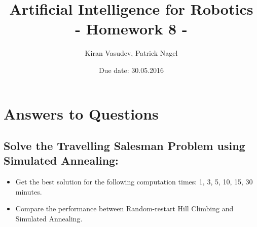 \documentclass[11pt]{article}
\title{\textbf{Artificial Intelligence for Robotics\\ - Homework 8 -}}
\author{Kiran Vasudev, Patrick Nagel}
\date{Due date: 30.05.2016}
\begin{document}
\maketitle

\newpage
\tableofcontents

\newpage

\section{Answers to Questions}
	\subsection{Solve the Travelling Salesman Problem using Simulated Annealing:}
	\begin{itemize}
		\item{Get the best solution for the following computation times: 1, 3, 5, 10, 15, 30 minutes.}
		\item{Compare the performance between Random-restart Hill Climbing and Simulated Annealing.}
	\end{itemize}
\newpage
\end{document}
